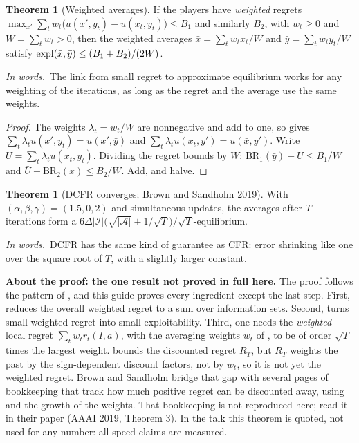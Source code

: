 \documentclass[11pt]{article}
\theoremstyle{definition}
\newtheorem{theorem}[definition]{Theorem}
\newcommand{\inwords}{\par\smallskip\noindent\textit{In words.}\ }
\begin{document}
\begin{theorem}[Weighted averages]\label{thm:wfolk}
If the players have \emph{weighted} regrets $\max_{x'}\sum_tw_t\big(u(x',y_t)-u(x_t,y_t)\big)\le B_1$ and similarly $B_2$, with
$w_t\ge0$ and $W=\sum_tw_t>0$, then the weighted averages $\bar x=\sum_tw_tx_t/W$ and $\bar y=\sum_tw_ty_t/W$ satisfy
$\mathrm{expl}(\bar x,\bar y)\le(B_1+B_2)/(2W)$.
\inwords The link from small regret to approximate equilibrium works for any weighting of the iterations, as long as the
regret and the average use the same weights.
\end{theorem}
\begin{proof}
The weights $\lambda_t=w_t/W$ are nonnegative and add to one, so  gives
$\sum_t\lambda_tu(x',y_t)=u(x',\bar y)$ and $\sum_t\lambda_tu(x_t,y')=u(\bar x,y')$. Write $\bar U=\sum_t\lambda_tu(x_t,y_t)$. Dividing the
regret bounds by $W$: $\mathrm{BR}_1(\bar y)-\bar U\le B_1/W$ and $\bar U-\mathrm{BR}_2(\bar x)\le B_2/W$. Add, and halve.
\end{proof}

\begin{theorem}[DCFR converges; Brown and Sandholm 2019]\label{thm:dcfr}
With $(\alpha,\beta,\gamma)=(1.5,0,2)$ and simultaneous updates, the averages after $T$ iterations form a
$6\Delta|\mathcal I|\big(\sqrt{|\mathcal A|}+1/\sqrt T\big)/\sqrt T$-equilibrium.
\inwords DCFR has the same kind of guarantee as CFR: error shrinking like one over the square root of $T$, with a
slightly larger constant.
\end{theorem}
\textbf{About the proof: the one result not proved in full here.} The proof follows the pattern of , and this
guide proves every ingredient except the last step. First,  reduces the overall weighted regret to a sum
over information sets. Second,  turns small weighted regret into small exploitability. Third, one needs
the \emph{weighted} local regret $\sum_tw_tr_t(I,a)$, with the averaging weights $w_t$ of , to be of order
$\sqrt T$ times the largest weight.  bounds the discounted regret $R_T$, but $R_T$ weights the past by the
sign-dependent discount factors, not by $w_t$, so it is not yet the weighted regret. Brown and Sandholm bridge that gap
with several pages of bookkeeping that track how much positive regret can be discounted away, using  and
the growth of the weights. That bookkeeping is not reproduced here; read it in their paper (AAAI 2019, Theorem 3). In
the talk this theorem is quoted, not used for any number: all speed claims are measured.
\end{document}
